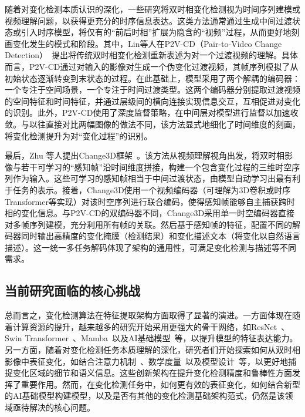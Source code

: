 随着对变化检测本质认识的深化，一些研究将双时相变化检测视为时间序列建模或视频理解问题，以获得更充分的时序信息表达。这类方法通常通过生成中间过渡状态或引入时序模型，将仅有的“前后时相”扩展为隐含的“视频”过程，从而更好地刻画变化发生的模式和阶段。其中，Lin等人在P2V-CD（Pair-to-Video Change Detection）~\cite{lin_transition_2023}提出将传统双时相变化检测重新表述为对一个过渡视频的理解。具体而言，P2V-CD通过对输入的影像对生成一个伪变化过渡视频，其帧序列模拟了从初始状态逐渐转变到末状态的过程。在此基础上，模型采用了两个解耦的编码器：一个专注于空间场景，一个专注于时间过渡类型。这两个编码器分别提取过渡视频的空间特征和时间特征，并通过层级间的横向连接实现信息交互，互相促进对变化的识别。此外，P2V-CD使用了深度监督策略，在中间层对模型进行监督以加速收敛。与以往直接对比两幅图像的做法不同，该方法显式地细化了时间维度的刻画，将变化检测提升为对“变化过程”的识别。

最后，Zhu 等人提出Change3D框架~\cite{Larson2007FlashVF}。该方法从视频理解视角出发，将双时相影像与若干可学习的“感知帧”沿时间维度拼接，构建一个包含变化过程的三维时空序列作为输入。这些可学习的感知帧相当于中间过渡状态，由模型自动学习出最有利于任务的表示。接着，Change3D使用一个视频编码器（可理解为3D卷积或时序Transformer等实现）对该时空序列进行联合编码，使得感知帧能够自主捕获跨时相的变化信息。与P2V-CD的双编码器不同，Change3D采用单一时空编码器直接对多帧序列建模，充分利用所有帧的关联。然后基于感知帧的特征，配置不同的解码器同时输出高精度的变化掩膜（检测结果）和变化描述文本（将变化以自然语言描述）。这一统一多任务解码体现了架构的通用性，可满足变化检测与描述等不同需求。


\subsection{当前研究面临的核心挑战}
总而言之，变化检测算法在特征提取架构方面取得了显著的演进。一方面体现在随着计算资源的提升，越来越多的研究开始采用更强大的骨干网络，如ResNet~\cite{He2015DeepRL}、Swin Transformer~\cite{Liu2021SwinTH}、Mamba~\cite{Zhu2024VisionME}以及AI基础模型~\cite{Kirillov2023SegmentA,Caron2021EmergingPI,simeoni2025dinov3}等，以提升模型的特征表达能力。另一方面，随着对变化检测任务本质理解的深化，研究者们开始探索如何从双时相影像中表征变化，如结合注意力机制~\cite{lu_cross_2024}、数学度量~\cite{dong_efficientcd_2024}以及模型设计~\cite{Han2023HCGMNetAH}等，以更好地捕捉变化区域的细节和语义信息。这些创新架构在提升变化检测精度和鲁棒性方面发挥了重要作用。然而，在变化检测任务中，如何更有效的表征变化，如何结合新型的AI基础模型构建模型，以及是否有其他的变化检测基础架构范式，仍然是该领域亟待解决的核心问题。


